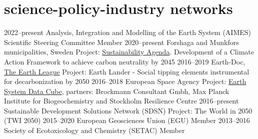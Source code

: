 \documentclass[]{friggeri-cv} %
\begin{document}

\section{science-policy-industry networks}

\begin{entrylist}
\entry
{\small{2022--present}}
{Analysis, Integration and Modelling of the Earth System (AIMES)}
{}
{Scientific Steering Committee Member}
\entry
{\small{2020--present}}
{Forshaga and Munkfors municipalities, Sweden}
{}
{Project: \href{https://www.forshaga.se/jobbochforetagande/startaochdrivaforetag/natverkochsamarbeten/natverkethallbaragenda.4.491d250d1775b5bab0279483.html}{Sustainability Agenda}. Development of a Climate Action Framework to achieve carbon neutrality by 2045}
\entry
{\small{2016--2019}}
{Earth-Doc, \href{http://www.the-earth-league.org/earth-doc-bios.html}{The Earth League}}
{}
{Project: Earth Lander - Social tipping elements instrumental for decarbonization by 2050}
\entry
{\small{2016--2018}}
{European Space Agency}
{}
{Project: \href{http://earthsystemdatacube.net/}{Earth System Data Cube}, partners: Brockmann Consultant Gmbh, Max Planck Institute for Biogeochemistry and Stockholm Resilience Centre}
\entry
{\small{2016--present}}
{Sustainable Development Solutions Network (SDSN)}
{}
{Project: The World in 2050 (TWI 2050)}
\entry
{\small{2015--2020}}
{European Geosciences Union (EGU)}
{}
{Member}
\entry
{\small{2013--2016}}
{Society of Ecotoxicology and Chemistry (SETAC)}
{}
{Member}
\end{entrylist}

\end{document}
